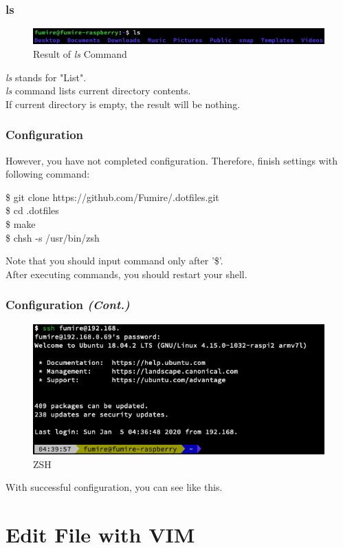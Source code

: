 \documentclass{beamer}
\begin{document}
	\begin{frame}
		\frametitle{ls}
		\begin{figure}[h!]
			\centering
			\includegraphics[width=0.7 \linewidth]{figures/3.png}
			\caption{Result of \textit{ls} Command}
		\end{figure}
	
		\textit{ls} stands for "List". \\
		\textit{ls} command lists current directory contents. \\
		If current directory is empty, the result will be nothing. 
	\end{frame}

	\begin{frame}
		\frametitle{Configuration}
		However, you have not completed configuration. Therefore, finish settings with following command:
		\begin{example}
			\$ git clone https://github.com/Fumire/.dotfiles.git \\
			\$ cd .dotfiles \\
			\$ make \\
			\$ chsh -s /usr/bin/zsh
		\end{example}
		Note that you should input command only after '\$'. \\
		After executing commands, you should restart your shell. 
	\end{frame}

	\begin{frame}
		\frametitle{Configuration \textit{(Cont.)}}
		\begin{figure}[h!]
			\centering
			\includegraphics[width=0.7 \linewidth]{figures/4.png}
			\caption{ZSH}
		\end{figure}
	
		With successful configuration, you can see like this. 
	\end{frame}
	
	\section{Edit File with VIM}
	
\end{document}
